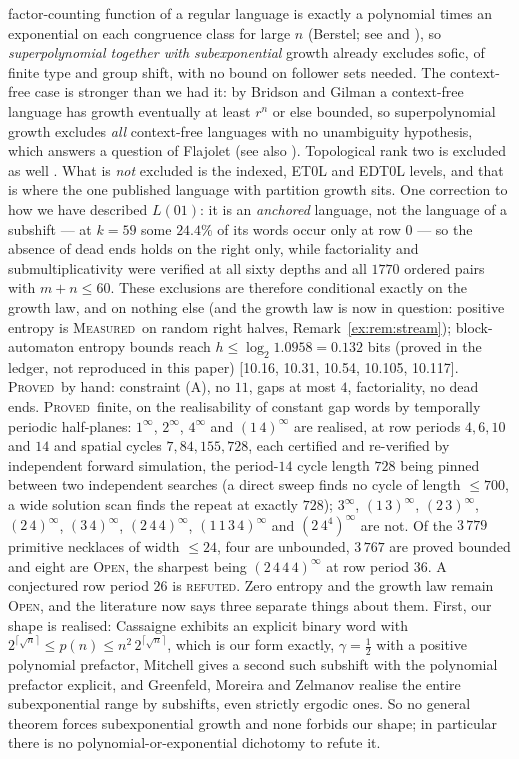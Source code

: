 \documentclass[11pt]{article}
\theoremstyle{definition}
\theoremstyle{remark}
\newcommand{\PROVED}{\textsc{Proved}}
\newcommand{\MEASURED}{\textsc{Measured}}
\newcommand{\OPEN}{\textsc{Open}}
\begin{document}
factor-counting function of a regular language is exactly a polynomial times an exponential on each
congruence class for large $n$ (Berstel; see \cite[Thm.~V.3]{FS} and \cite{SYZS}), so
\emph{superpolynomial together with subexponential} growth already excludes sofic, of finite type and
group shift, with no bound on follower sets needed. The context-free case is stronger than we had it:
by Bridson and Gilman \cite[Thm.~1.1]{BG} a context-free language has growth eventually at least $r^n$
or else bounded, so superpolynomial growth excludes \emph{all} context-free languages with no
unambiguity hypothesis, which answers a question of Flajolet (see also \cite{Incitti}). Topological rank two is excluded as well
\cite[Cor.~6.6]{DDMP}. What is \emph{not} excluded is the indexed, ET0L and EDT0L levels, and that is
where the one published language with partition growth sits. One correction to how we have described
$L(01)$: it is an \emph{anchored} language, not the language of a subshift --- at $k=59$ some
$24.4\%$ of its words occur only at row $0$ --- so the absence of dead ends holds on the right only,
while factoriality and submultiplicativity were verified at all sixty depths and all $1770$ ordered pairs with $m+n\le60$.
These exclusions are therefore conditional exactly on the growth law, and on nothing else (and the growth law is now in question: positive entropy is \MEASURED\ on random right halves, Remark~\ref{ex:rem:stream}); block-automaton entropy bounds reach $h\le\log_2 1.0958=0.132$ bits (proved in the ledger, not reproduced in this paper) [10.16, 10.31, 10.54, 10.105, 10.117]. \PROVED\ by hand: constraint (A), no $11$, gaps at most $4$, factoriality, no dead ends. \PROVED\ finite, on the realisability of constant gap words by temporally periodic half-planes: $1^\infty$, $2^\infty$, $4^\infty$ and $(1\,4)^\infty$ are realised, at row periods $4,6,10$ and $14$ and spatial cycles $7,84,155,728$, each certified and re-verified by independent forward simulation, the period-$14$ cycle length $728$ being pinned between two independent searches (a direct sweep finds no cycle of length $\le700$, a wide solution scan finds the repeat at exactly $728$); $3^\infty$, $(1\,3)^\infty$, $(2\,3)^\infty$, $(2\,4)^\infty$, $(3\,4)^\infty$, $(2\,4\,4)^\infty$, $(1\,1\,3\,4)^\infty$ and $(2\,4^4)^\infty$ are not. Of the $3\,779$ primitive necklaces of width $\le24$, four are unbounded, $3\,767$ are proved bounded and eight are \OPEN, the sharpest being $(2\,4\,4\,4)^\infty$ at row period $36$. A conjectured row period $26$ is \textsc{refuted}. Zero entropy and the growth law remain \OPEN, and the literature now says three separate things about
them. First, our shape is realised: Cassaigne \cite[Thm.~1]{Cass02} exhibits an explicit binary word
with $2^{\lceil\sqrt n\rceil}\le p(n)\le n^2\,2^{\lceil\sqrt n\rceil}$, which is our form exactly,
$\gamma=\tfrac12$ with a positive polynomial prefactor, Mitchell \cite{Mitchell} gives a second such subshift with the polynomial prefactor explicit, and Greenfeld, Moreira and Zelmanov
\cite{GMZ} realise the entire subexponential range by subshifts, even strictly ergodic ones. So no
general theorem forces subexponential growth and none forbids our shape; in particular there is no
polynomial-or-exponential dichotomy to refute it.
\end{document}
